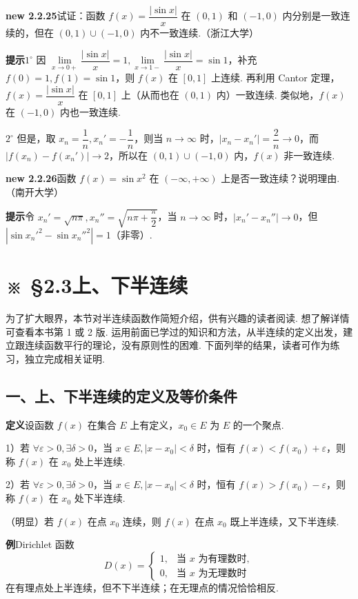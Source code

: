 \documentclass[UTF8, 12pt, fontset=fandol, oneside]{ctexart}
\begin{document}
\noindent\textbf{new 2.2.25}\quad 试证：函数 $f(x)=\dfrac{|\sin x|}{x}$ 在 $(0,1)$ 和 $(-1,0)$ 内分别是一致连续的，但在 $(0,1)\cup(-1,0)$ 内不一致连续.（浙江大学）

\noindent\textbf{提示}\quad $1^\circ$ 因 $\lim\limits_{x\to0+}\dfrac{|\sin x|}{x}=1,\lim\limits_{x\to1-}\dfrac{|\sin x|}{x}=\sin1$，补充 $f(0)=1,f(1)=\sin1$，则 $f(x)$ 在 $[0,1]$ 上连续. 再利用 Cantor 定理，$f(x)=\dfrac{|\sin x|}{x}$ 在 $[0,1]$ 上（从而也在 $(0,1)$ 内）一致连续. 类似地，$f(x)$ 在 $(-1,0)$ 内也一致连续.

$2^\circ$ 但是，取 $x_n=\dfrac1n,x_n'=-\dfrac1n$，则当 $n\to\infty$ 时，$|x_n-x_n'|=\dfrac2n\to0$，而 $|f(x_n)-f(x_n')|\to2$，所以在 $(0,1)\cup(-1,0)$ 内，$f(x)$ 非一致连续.

\noindent\textbf{new 2.2.26}\quad 函数 $f(x)=\sin x^2$ 在 $(-\infty,+\infty)$ 上是否一致连续？说明理由.（南开大学）

\noindent\textbf{提示}\quad 令 $x_n'=\sqrt{n\pi},x_n''=\sqrt{n\pi+\dfrac\pi2}$，当 $n\to\infty$ 时，$|x_n'-x_n''|\to0$，但 $|\sin x_n'^2-\sin x_n''^2|=1$（非零）.

\section*{※ §2.3\quad 上、下半连续}

为了扩大眼界，本节对半连续函数作简短介绍，供有兴趣的读者阅读. 想了解详情可查看本书第 1 或 2 版. 运用前面已学过的知识和方法，从半连续的定义出发，建立跟连续函数平行的理论，没有原则性的困难. 下面列举的结果，读者可作为练习，独立完成相关证明.

\subsection*{一、上、下半连续的定义及等价条件}

\noindent\textbf{定义}\quad 设函数 $f(x)$ 在集合 $E$ 上有定义，$x_0\in E$ 为 $E$ 的一个聚点.

1）若 $\forall\varepsilon>0,\exists\delta>0$，当 $x\in E,|x-x_0|<\delta$ 时，恒有 $f(x)<f(x_0)+\varepsilon$，则称 $f(x)$ 在 $x_0$ 处上半连续.

2）若 $\forall\varepsilon>0,\exists\delta>0$，当 $x\in E,|x-x_0|<\delta$ 时，恒有 $f(x)>f(x_0)-\varepsilon$，则称 $f(x)$ 在 $x_0$ 处下半连续.

（明显）若 $f(x)$ 在点 $x_0$ 连续，则 $f(x)$ 在点 $x_0$ 既上半连续，又下半连续.

\noindent\textbf{例}\quad Dirichlet 函数
\[
  D(x)=
  \begin{cases}
    1, & \text{当 }x\text{ 为有理数时},\\
    0, & \text{当 }x\text{ 为无理数时}
  \end{cases}
\]
在有理点处上半连续，但不下半连续；在无理点的情况恰恰相反.
\end{document}
